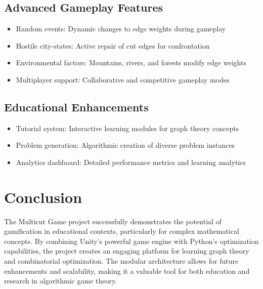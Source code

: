 \documentclass[english]{tudscrreprt}
\begin{document}
\subsection{Advanced Gameplay Features}
\begin{itemize}
  \item Random events: Dynamic changes to edge weights during gameplay
  \item Hostile city-states: Active repair of cut edges for confrontation
  \item Environmental factors: Mountains, rivers, and forests modify edge weights
  \item Multiplayer support: Collaborative and competitive gameplay modes
\end{itemize}

\subsection{Educational Enhancements}
\begin{itemize}
  \item Tutorial system: Interactive learning modules for graph theory concepts
  \item Problem generation: Algorithmic creation of diverse problem instances
  \item Analytics dashboard: Detailed performance metrics and learning analytics
\end{itemize}

\section{Conclusion}
The Multicut Game project successfully demonstrates the potential of gamification in educational contexts, particularly for complex mathematical concepts. By combining Unity's powerful game engine with Python's optimization capabilities, the project creates an engaging platform for learning graph theory and combinatorial optimization. The modular architecture allows for future enhancements and scalability, making it a valuable tool for both education and research in algorithmic game theory.

\printbibliography[heading=bibintoc]\label{sec:bibliography}%
\end{document}
